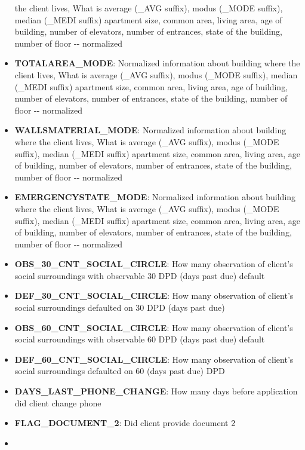 \documentclass[11pt]{article}
\begin{document}
\begin{itemize}
  the client lives, What is average (\_AVG suffix), modus (\_MODE
  suffix), median (\_MEDI suffix) apartment size, common area, living
  area, age of building, number of elevators, number of entrances, state
  of the building, number of floor -\/- normalized
\item
  \textbf{TOTALAREA\_MODE}: Normalized information about building where
  the client lives, What is average (\_AVG suffix), modus (\_MODE
  suffix), median (\_MEDI suffix) apartment size, common area, living
  area, age of building, number of elevators, number of entrances, state
  of the building, number of floor -\/- normalized
\item
  \textbf{WALLSMATERIAL\_MODE}: Normalized information about building
  where the client lives, What is average (\_AVG suffix), modus (\_MODE
  suffix), median (\_MEDI suffix) apartment size, common area, living
  area, age of building, number of elevators, number of entrances, state
  of the building, number of floor -\/- normalized
\item
  \textbf{EMERGENCYSTATE\_MODE}: Normalized information about building
  where the client lives, What is average (\_AVG suffix), modus (\_MODE
  suffix), median (\_MEDI suffix) apartment size, common area, living
  area, age of building, number of elevators, number of entrances, state
  of the building, number of floor -\/- normalized
\item
  \textbf{OBS\_30\_CNT\_SOCIAL\_CIRCLE}: How many observation of
  client's social surroundings with observable 30 DPD (days past due)
  default
\item
  \textbf{DEF\_30\_CNT\_SOCIAL\_CIRCLE}: How many observation of
  client's social surroundings defaulted on 30 DPD (days past due)\\
\item
  \textbf{OBS\_60\_CNT\_SOCIAL\_CIRCLE}: How many observation of
  client's social surroundings with observable 60 DPD (days past due)
  default
\item
  \textbf{DEF\_60\_CNT\_SOCIAL\_CIRCLE}: How many observation of
  client's social surroundings defaulted on 60 (days past due) DPD\\
\item
  \textbf{DAYS\_LAST\_PHONE\_CHANGE}: How many days before application
  did client change phone\\
\item
  \textbf{FLAG\_DOCUMENT\_2}: Did client provide document 2\\
\item

\end{itemize}
\end{document}
